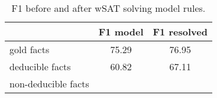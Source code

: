 \begin{table*}
\begin{tabular}{ l|c|c} 
& F1 model & F1 resolved \\\hline
gold facts & 75.29 & 76.95\\\hline
deducible facts& 60.82& 67.11\\\hline
non-deducible facts&& \\\hline

\end{tabular}
\caption{F1 before and after wSAT solving model rules.}
\end{table*}